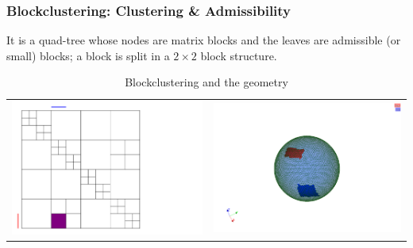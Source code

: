 \begin{frame}
\frametitle{Blockclustering: Clustering \& Admissibility}
It is a quad-tree whose nodes are matrix blocks and the leaves are admissible (or small) blocks; a block is split in a $2 \times 2$ block structure. 
\begin{table}[ht]
\centering
\begin{tabular}{cc}
\includegraphics[scale=0.4]{./img/BlockClusteringA.png} & \includegraphics[scale=0.244]{./img/BlockClusteringB.png}
\end{tabular}
\caption{Blockclustering and the geometry}
\end{table}
\end{frame}

